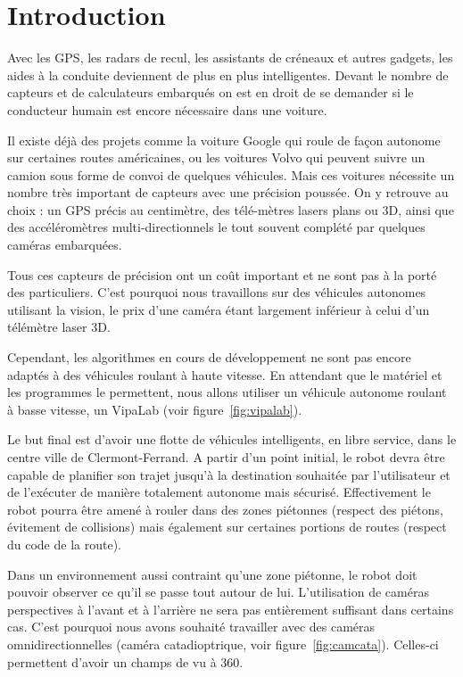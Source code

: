 \section{Introduction}

Avec les GPS, les radars de recul, les assistants de créneaux et autres gadgets, les aides à la conduite deviennent de plus en plus intelligentes.
Devant le nombre de capteurs et de calculateurs embarqués on est en droit de se demander si le conducteur humain est encore nécessaire dans une voiture.

Il existe déjà des projets comme la voiture Google qui roule de façon autonome sur certaines routes américaines, ou les voitures Volvo qui peuvent suivre un camion sous forme de convoi de quelques véhicules.
Mais ces voitures nécessite un nombre très important de capteurs avec une précision poussée.
On y retrouve au choix : un GPS précis au centimètre, des télé-mètres lasers plans ou 3D, ainsi que des accéléromètres multi-directionnels le tout souvent complété par quelques caméras embarquées.

Tous ces capteurs de précision ont un coût important et ne sont pas à la porté des particuliers.
C'est pourquoi nous travaillons sur des véhicules autonomes utilisant la vision, le prix d'une caméra étant largement inférieur à celui d'un télémètre laser 3D.


Cependant, les algorithmes en cours de développement ne sont pas encore adaptés à des véhicules roulant à haute vitesse.
En attendant que le matériel et les programmes le permettent, nous allons utiliser un véhicule autonome roulant à basse vitesse, un VipaLab (voir figure~\ref{fig:vipalab}).


Le but final est d'avoir une flotte de véhicules intelligents, en libre service, dans le centre ville de Clermont-Ferrand.
A partir d'un point initial, le robot devra être capable de planifier son trajet jusqu'à la destination souhaitée par l'utilisateur et de l'exécuter de manière totalement autonome mais sécurisé.
Effectivement le robot pourra être amené à rouler dans des zones piétonnes (respect des piétons, évitement de collisions) mais également sur certaines portions de routes (respect du code de la route).

Dans un environnement aussi contraint qu'une zone piétonne, le robot doit pouvoir observer ce qu'il se passe tout autour de lui.
L'utilisation de caméras perspectives à l'avant et à l'arrière ne sera pas entièrement suffisant dans certains cas.
C'est pourquoi nous avons souhaité travailler avec des caméras omnidirectionnelles (caméra catadioptrique, voir figure~\ref{fig:camcata}).
Celles-ci permettent d'avoir un champs de vu à 360\degre.

